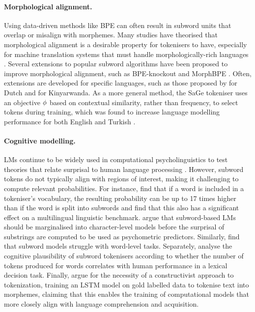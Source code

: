 \paragraph{Morphological alignment.} Using data-driven methods like BPE can often result in subword units that overlap or misalign with morphemes. Many studies have theorised that morphological alignment is a desirable property for tokenisers to have, especially for machine translation systems that must handle morphologically-rich languages \citep{pan2020morphological}. Several extensions to popular subword algorithms have been proposed to improve morphological alignment, such as BPE-knockout \citep{bauwens-delobelle-2024-bpe} and MorphBPE \citep{asgari2025morphbpe}. Often, extensions are developed for specific languages, such as those proposed by \citet{kildeberg2025sm} for Dutch and \citet{nzeyimana-niyongabo-rubungo-2022-kinyabert} for Kinyarwanda. As a more general method, the SaGe tokeniser uses an objective $\phi$ based on contextual similarity, rather than frequency, to select tokens during training, which was found to increase language modelling performance for both English and Turkish \citep{yehezkel2023incorporating}. 

\paragraph{Cognitive modelling.} LMs continue to be widely used in computational psycholinguistics to test theories that relate surprisal to human language processing \citep{shain2024}. However, subword tokens do not typically align with regions of interest, making it challenging to compute relevant probabilities. For instance, \citet{lesci2025causal} find that if a word is included in a tokeniser's vocabulary, the resulting probability can be up to 17 times higher than if the word is split into subwords and \citet{jumelet2025multiblimp10massivelymultilingual} find that this also has a significant effect on a multilingual linguistic benchmark. \citet{giulianelli-etal-2024-proper} argue that subword-based LMs should be marginalised into character-level models before the surprisal of substrings are computed to be used as psychometric predictors. Similarly, \citet{bunzeck2025subwordmodelsstruggleword} find that subword models struggle with word-level tasks. Separately, \citet{beinborn-pinter-2023-analyzing} analyse the cognitive plausibility of subword tokenisers according to whether the number of tokens produced for words correlates with human performance in a lexical decision task. Finally, \citet{fan-sun-2023-constructivist} argue for the necessity of a constructivist approach to tokenization, training an LSTM model on gold labelled data to tokenise text into morphemes, claiming that this enables the training of computational models that more closely align with language comprehension and acquisition. 

